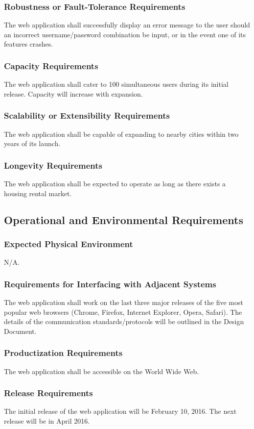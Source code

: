 \documentclass[12pt]{article}
\begin{document}
{\subsubsection{Robustness or Fault-Tolerance Requirements}
The web application shall successfully display an error message to the user 
should an incorrect username/password combination be input, or in the event one of its features crashes.
\subsubsection{Capacity Requirements}
The web application shall cater to 100 simultaneous users during its initial release. Capacity will increase with expansion.
\subsubsection{Scalability or Extensibility Requirements}
The web application shall be capable of expanding to nearby cities within two 
years of its launch.
\subsubsection{Longevity Requirements}
The web application shall be expected to operate as long as there exists a 
housing rental market.
\subsection{Operational and Environmental Requirements}
\subsubsection{Expected Physical Environment}
N/A.
\subsubsection{Requirements for Interfacing with Adjacent Systems}
The web application shall work on the last three major releases of the five most 
popular web browsers (Chrome, Firefox, Internet Explorer, Opera, Safari). The details 
of the communication standards/protocols will be outlined in the Design Document.
\subsubsection{Productization Requirements}
The web application shall be accessible on the World Wide Web.
\subsubsection{Release Requirements}
The initial release of the web application will be February 10, 2016. The next 
release will be in April 2016.
}
\end{document}

